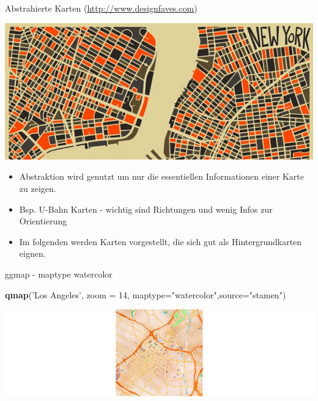 \documentclass[ignorenonframetext,]{beamer}
\newenvironment{Shaded}{\begin{snugshade}}{\end{snugshade}}
\newcommand{\KeywordTok}[1]{\textcolor[rgb]{0.13,0.29,0.53}{\textbf{#1}}}
\newcommand{\DataTypeTok}[1]{\textcolor[rgb]{0.13,0.29,0.53}{#1}}
\newcommand{\DecValTok}[1]{\textcolor[rgb]{0.00,0.00,0.81}{#1}}
\newcommand{\StringTok}[1]{\textcolor[rgb]{0.31,0.60,0.02}{#1}}
\newcommand{\NormalTok}[1]{#1}
\begin{document}
\begin{frame}{Abstrahierte Karten
(\href{http://www.designfaves.com/2014/03/abstracted-maps-reveal-cities-personalities}{http://www.designfaves.com})}

\includegraphics{figure/NYabstracted.jpg}

\begin{itemize}
\item
  Abstraktion wird genutzt um nur die essentiellen Informationen einer
  Karte zu zeigen.
\item
  Bsp. U-Bahn Karten - wichtig sind Richtungen und wenig Infos zur
  Orientierung
\item
  Im folgenden werden Karten vorgestellt, die sich gut als
  Hintergrundkarten eignen.
\end{itemize}

\end{frame}

\begin{frame}[fragile]{ggmap - maptype watercolor}

\begin{Shaded}
\begin{Highlighting}[]
\KeywordTok{qmap}\NormalTok{(}\StringTok{'Los Angeles'}\NormalTok{, }\DataTypeTok{zoom =} \DecValTok{14}\NormalTok{,}
 \DataTypeTok{maptype=}\StringTok{"watercolor"}\NormalTok{,}\DataTypeTok{source=}\StringTok{"stamen"}\NormalTok{)}
\end{Highlighting}
\end{Shaded}

\includegraphics{figure/lastamen.png}

\end{frame}
\end{document}
